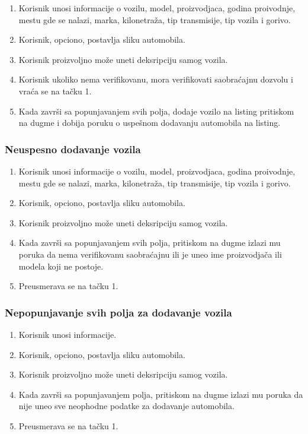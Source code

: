 \documentclass[12pt]{article}
\begin{document}
\begin{enumerate}
    \item Korisnik unosi informacije o vozilu, model, proizvodjaca, godina proivodnje, mestu gde se nalazi, marka, kilonetraža, tip transmisije, tip vozila i gorivo.
    \item Korisnik, opciono, postavlja sliku automobila.
    \item Korisnik proizvoljno može uneti deksripciju samog vozila.
    \item Korisnik ukoliko nema  verifikovanu, mora verifikovati saobraćajnu dozvolu i vraća se na tačku 1.
    \item Kada završi sa popunjavanjem svih polja, dodaje vozilo na listing pritiskom na dugme i dobija poruku o uspešnom dodavanju automobila na listing.
\end{enumerate}

\subsubsection{Neuspesno dodavanje vozila}

\begin{enumerate}
    \item Korisnik unosi informacije o vozilu, model, proizvodjaca, godina proivodnje, mestu gde se nalazi, marka, kilonetraža, tip transmisije, tip vozila i gorivo.
    \item Korisnik, opciono, postavlja sliku automobila.
    \item Korisnik proizvoljno može uneti deksripciju samog vozila.
    \item Kada završi sa popunjavanjem svih polja, pritiskom na dugme izlazi mu poruka da nema verifikovanu saobraćajnu ili je uneo ime proizvodjača ili modela koji ne postoje.
    \item Preusmerava se na tačku 1.
\end{enumerate}

\subsubsection{Nepopunjavanje svih polja za dodavanje vozila}

\begin{enumerate}
    \item Korisnik unosi informacije.
    \item Korisnik, opciono, postavlja sliku automobila.
    \item Korisnik proizvoljno može uneti deksripciju samog vozila.
    \item Kada završi sa popunjavanjem polja, pritiskom na dugme izlazi mu poruka da nije uneo sve neophodne podatke za dodavanje automobila.
    \item Preusmerava se na tačku 1.
\end{enumerate}
\end{document}
